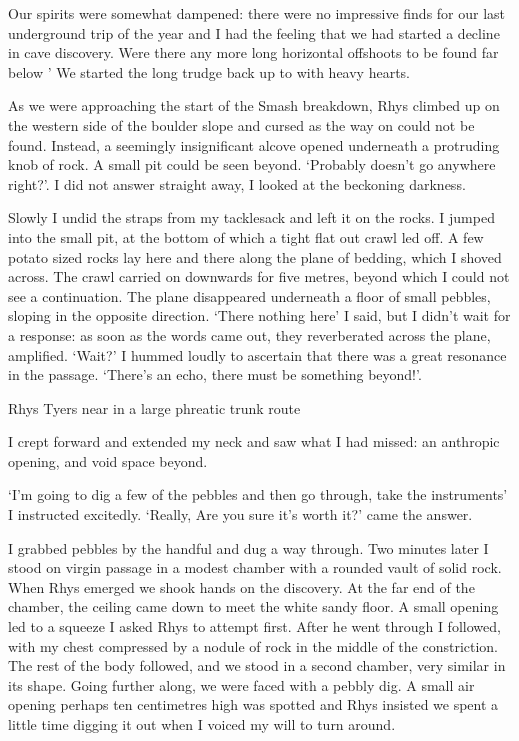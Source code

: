 Our spirits were somewhat dampened: there were no impressive finds for our last underground trip of the year and I had the feeling that we had started a decline in cave discovery. Were there any more long horizontal offshoots to be found far below ' We started the long trudge back up to  with heavy hearts.

As we were approaching the start of the Smash breakdown, Rhys climbed up on the western side of the boulder slope and cursed as the way on could not be found. Instead, a seemingly insignificant alcove opened underneath a protruding knob of rock. A small pit could be seen beyond. `Probably doesn't go anywhere right?'. I did not answer straight away, I looked at the beckoning darkness.

Slowly I undid the straps from my tacklesack and left it on the rocks. I jumped into the small  pit, at the bottom of which a tight flat out crawl led off. A few potato sized rocks lay here and there along the plane of bedding, which I shoved across. The crawl carried on downwards for five metres, beyond which I could not see a continuation. The plane disappeared underneath a floor of small pebbles, sloping in the opposite direction. `There nothing here' I said, but I didn't wait for a response: as soon as the words came out, they reverberated across the plane, amplified. `Wait?' I hummed loudly to ascertain that there was a great resonance in the passage. `There's an echo, there must be something beyond!'.
\begin{marginfigure}
	\checkoddpage \ifoddpage \forcerectofloat \else \forceversofloat \fi
	\centering
	\caption{Rhys Tyers near  in a large phreatic trunk route }
	\label{near duck}
\end{marginfigure}


I crept forward and extended my neck and saw what I had missed: an anthropic opening, and void space beyond. 

`I'm going to dig a few of the pebbles and then go through, take the instruments' I instructed excitedly. `Really, Are you sure it's worth it?' came the answer. 

I grabbed pebbles by the handful and dug a way through. Two minutes later I stood on virgin passage in a modest chamber with a rounded vault of solid rock. When Rhys emerged we shook hands on the discovery. At the far end of the chamber, the ceiling came down to meet the white sandy floor. A small opening led to a squeeze I asked Rhys to attempt first. After he went through I followed, with my chest compressed by a nodule of rock in the middle of the constriction. The rest of the body followed, and we stood in a second chamber, very similar in its shape. Going further along, we were faced with a pebbly dig. A small air opening perhaps ten centimetres high was spotted and Rhys insisted we spent a little time digging it out when I voiced my will to turn around. 

